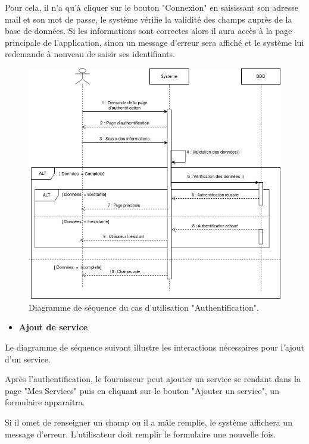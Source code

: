 \documentclass[french]{report}
\begin{document}
	Pour cela, il n'a qu'à cliquer sur le bouton "Connexion" en saisissant 
	son adresse mail et son mot de passe, le système vérifie la validité des 
	champs auprès de la base de données. Si les informations sont correctes alors 
	il aura accès à la page principale de l'application, sinon un message d'erreur
	sera affiché et le système lui redemande à nouveau de saisir ses identifiants.
	
        \begin{figure}[H]
            \centering
            \includegraphics[width=1\textwidth]{images/Connexion Seq Diagram.drawio.png}
            \caption{Diagramme de séquence du cas d'utilisation "Authentification".}
            \label{fig:my_label}
        \end{figure}
        
\begin{itemize}
\item  \textbf{Ajout de service}
\end{itemize}
	Le diagramme de séquence suivant illustre les interactions nécessaires pour l'ajout d'un service. 
	
	Après l'authentification, le fournisseur peut ajouter un service se rendant dans
	la page "Mes Services" puis en cliquant sur le bouton "Ajouter un service", un formulaire apparaîtra.
	
	Si il omet de renseigner un champ ou il a mâle remplie, le système affichera un message d'erreur.
	L'utilisateur doit remplir le formulaire une nouvelle fois.
	
\end{document}

